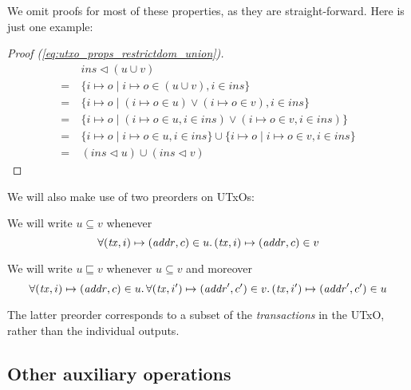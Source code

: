 \documentclass{article}
\newcommand{\restrictdom}{\lhd}
\theoremstyle{definition}{
  \newtheorem{lemma}{Lemma}[section] %
  \newtheorem{definition}[lemma]{Definition}
}
\theoremstyle{theorem}{
  \newtheorem{invariant}[lemma]{Invariant}
  \newtheorem{proofobligation}[lemma]{Proof Obligation}
}
\numberwithin{equation}{lemma}
\begin{document}
We omit proofs for most of these properties, as they are straight-forward.
Here is just one example:
%
\begin{proof}[Proof (\eqref{eq:utxo_props_restrictdom_union})]
\begin{align*}
  & ~ \mathit{ins} \restrictdom (u \cup v) \\
= & ~ \{ i \mapsto o \mid i \mapsto o \in (u \cup v), i \in \mathit{ins} \} \\
= & ~ \{ i \mapsto o \mid (i \mapsto o \in u) \vee (i \mapsto o \in v), i \in \mathit{ins} \} \\
= & ~ \{ i \mapsto o \mid (i \mapsto o \in u, i \in \mathit{ins}) \vee (i \mapsto o \in v, i \in \mathit{ins}) \} \\
= & ~ \{ i \mapsto o \mid i \mapsto o \in u, i \in \mathit{ins} \} \cup \{ i \mapsto o \mid i \mapsto o \in v, i \in \mathit{ins} \} \\
= & ~ (\mathit{ins} \restrictdom u) \cup (\mathit{ins} \restrictdom v)
\end{align*}
\end{proof}

We will also make use of two preorders on UTxOs:

\begin{definition}[$u \subseteq v$]
We will write $u \subseteq v$ whenever
\begin{equation*}
\forall (\mathit{tx}, i)  \mapsto (\mathit{addr}, c) \in u \ldotp
(\mathit{tx}, i)  \mapsto (\mathit{addr}, c) \in v
\end{equation*}
\end{definition}

\begin{definition}[$u \sqsubseteq v$]
We will write $u \sqsubseteq v$ whenever $u \subseteq v$ and moreover
\begin{equation*}
\forall (\mathit{tx}, i)  \mapsto (\mathit{addr}, c) \in u \ldotp
\forall (\mathit{tx}, i') \mapsto (\mathit{addr}', c') \in v \ldotp
(\mathit{tx}, i') \mapsto (\mathit{addr}', c') \in u
\end{equation*}
\end{definition}

The latter preorder corresponds to a subset of the \emph{transactions}
in the UTxO, rather than the individual outputs.

\subsection{Other auxiliary operations}
\end{document}
